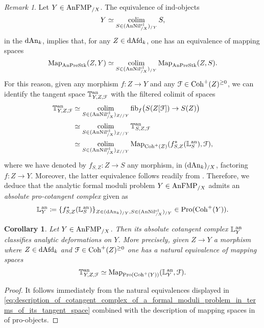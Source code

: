 \documentclass[10pt,a4paper,reqno]{amsart} %
\theoremstyle{plain}
\newtheorem{cor}[thm]{Corollary}
\theoremstyle{definition}
\theoremstyle{remark}
\newtheorem{rem}[thm]{Remark}
\numberwithin{equation}{section}
\begin{document}
\begin{rem} \label{rem:construction_of_analytic_cotangent_complex_of_analytic_FMP_over_X} Let $Y \in \mathrm{AnFMP}_{/X}$.
    The equivalence of ind-objects
        \[
            Y \simeq \operatorname*{colim}_{S \in (\mathrm{AnNil}^{\mathrm{cl}}_{/X})_{/Y}} S,
        \]
    in the \infcat $\mathrm{dAn}_k$, implies that, for any $Z \in \mathrm{dAfd}_k$, one has an equivalence of mapping spaces
        \[
            \operatorname{Map}_{\mathrm{AnPreStk}}(Z, Y) \simeq \operatorname*{colim}_{S \in (\mathrm{AnNil}^{\mathrm{cl}}_{/X})_{/Y}}  \operatorname{Map}_{\mathrm{AnPreStk}}(Z,S ).
        \]
    For this reason, given any morphism $f \colon Z \to Y$ and any
    $\mathcal F \in \mathrm{Coh}^+(Z)^{\ge 0}$, we can identify the tangent space $\mathbb T^\mathrm{an}_{Y, Z, \mathcal F}$
    with the filtered colimit of spaces
        \begin{align} \label{eq:description_of_cotangent_complex_of_a_formal_moduli_problem_in_terms_of_its_tangent_space}
            \mathbb T^\mathrm{an}_{Y, Z, \mathcal F} & \simeq \operatorname*{colim}_{S \in (\mathrm{AnNil}^{\mathrm{cl}}_{/X})_{Z/ /Y}} \mathrm{fib}_f \big( S(Z[\mathcal F]) \to S(Z) \big) \\
                                & \simeq \operatorname*{colim}_{S \in (\mathrm{AnNil}^{\mathrm{cl}}_{/X})_{Z/ /Y}} \mathbb T^\mathrm{an}_{S, Z , \mathcal F } \\
                                & \simeq \operatorname*{colim}_{S \in (\mathrm{AnNil}^{\mathrm{cl}}_{/X})_{Z/ /Y}} \operatorname{Map}_{\mathrm{Coh}^+(Z)} (f_{S,Z}^* (\mathbb L^\mathrm{an}_S), \mathcal F),
        \end{align}
    where we have denoted by $f_{S, Z} \colon Z \to S$ any morphism, in $(\mathrm{dAn}_k)_{/X}$, factoring $f \colon Z \to Y$.
    Moreover, the latter equivalence follows readily from \cite[Lemma 7.7]{Porta_Yu_Representability}. Therefore, we deduce that
    the analytic formal moduli problem
    $Y \in \mathrm{AnFMP}_{/X}$ admits an \emph{absolute pro-cotangent complex} given as
        \[
           \mathbb L^\mathrm{an}_Y \coloneqq \{ f^*_{S,Z}( \mathbb L^\mathrm{an}_S )  \}_{Z \in (\mathrm{dAn}_k)_{/Y}, S \in (\mathrm{AnNil}^{\mathrm{cl}}_{/X})_{/Y}} \in \mathrm{Pro}(\mathrm{Coh}^+(Y)).
        \]
\end{rem}   

\begin{cor}
    Let $Y \in \mathrm{AnFMP}_{/X}$. Then its absolute cotangent complex $\mathbb L^\mathrm{an}_Y$ classifies analytic deformations on $Y$. More precisely, given $Z \to Y$ a morphism
    where $Z \in \mathrm{dAfd}_k$ and $\mathcal F \in \mathrm{Coh}^+(Z)^{\ge 0}$ one has a natural equivalence of mapping spaces
        \[
            \mathbb T^\mathrm{an}_{Y, Z, \mathcal F} \simeq \operatorname{Map}_{\mathrm{Pro}(\mathrm{Coh}^+(Y))}(\mathbb L^\mathrm{an}_Y, \mathcal F).  
        \]
\end{cor}

\begin{proof}
    It follows immediately from the natural equivalences displayed in \eqref{eq:description_of_cotangent_complex_of_a_formal_moduli_problem_in_terms_of_its_tangent_space}
    combined with the description of mapping spaces in \infcats of pro-objects.
\end{proof}
\end{document}
